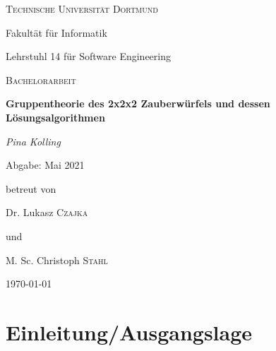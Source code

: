 \documentclass[12pt,a4paper, usenames, dvipsnames]{article}
\begin{document}
\begin{titlepage}
	\centering
	{\scshape\LARGE Technische Universität Dortmund \par}
	Fakultät für Informatik \par
	Lehrstuhl 14 für Software Engineering \par
	\vspace{1cm}
	{\scshape\Large Bachelorarbeit \par }
	\vspace{1.5cm}
	{\huge\bfseries  Gruppentheorie des 2x2x2 Zauberwürfels und dessen Lösungsalgorithmen \par}
	\vspace{2cm}
	{\Large\itshape Pina Kolling\par}
	\vspace{0.5cm}
	{Abgabe: Mai 2021 \par }
	\vfill
	betreut von\par
	Dr. Lukasz \textsc{Czajka} \par 
	und \par 
	M. Sc. Christoph \textsc{Stahl} 

	\vfill

	{\large \today\par}
\end{titlepage}


\tableofcontents

\thispagestyle{empty} 



\newpage

\setcounter{page}{1} 



















\section{Einleitung/Ausgangslage}
\end{document}
